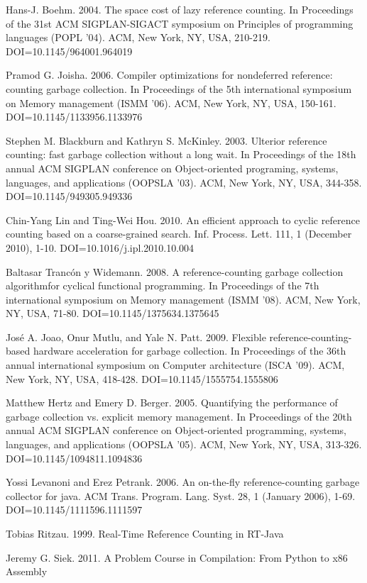 \documentclass{sigplanconf}
\begin{document}
\begin{thebibliography}{}
\softraggedright

Hans-J. Boehm. 2004. The space cost of lazy reference counting. In Proceedings of the 31st ACM SIGPLAN-SIGACT symposium on Principles of programming languages (POPL '04). ACM, New York, NY, USA, 210-219. DOI=10.1145/964001.964019 

Pramod G. Joisha. 2006. Compiler optimizations for nondeferred reference: counting garbage collection. In Proceedings of the 5th international symposium on Memory management (ISMM '06). ACM, New York, NY, USA, 150-161. DOI=10.1145/1133956.1133976

Stephen M. Blackburn and Kathryn S. McKinley. 2003. Ulterior reference counting: fast garbage collection without a long wait. In Proceedings of the 18th annual ACM SIGPLAN conference on Object-oriented programing, systems, languages, and applications (OOPSLA '03). ACM, New York, NY, USA, 344-358. DOI=10.1145/949305.949336

Chin-Yang Lin and Ting-Wei Hou. 2010. An efficient approach to cyclic reference counting based on a coarse-grained search. Inf. Process. Lett. 111, 1 (December 2010), 1-10. DOI=10.1016/j.ipl.2010.10.004 

Baltasar Trancón y Widemann. 2008. A reference-counting garbage collection algorithmfor cyclical functional programming. In Proceedings of the 7th international symposium on Memory management (ISMM '08). ACM, New York, NY, USA, 71-80. DOI=10.1145/1375634.1375645 

José A. Joao, Onur Mutlu, and Yale N. Patt. 2009. Flexible reference-counting-based hardware acceleration for garbage collection. In Proceedings of the 36th annual international symposium on Computer architecture (ISCA '09). ACM, New York, NY, USA, 418-428. DOI=10.1145/1555754.1555806

Matthew Hertz and Emery D. Berger. 2005. Quantifying the performance of garbage collection vs. explicit memory management. In Proceedings of the 20th annual ACM SIGPLAN conference on Object-oriented programming, systems, languages, and applications (OOPSLA '05). ACM, New York, NY, USA, 313-326. DOI=10.1145/1094811.1094836  

Yossi Levanoni and Erez Petrank. 2006. An on-the-fly reference-counting garbage collector for java. ACM Trans. Program. Lang. Syst. 28, 1 (January 2006), 1-69. DOI=10.1145/1111596.1111597 

Tobias Ritzau. 1999.  Real-Time Reference Counting in RT-Java

Jeremy G. Siek. 2011.  A Problem Course in Compilation: From Python to x86 Assembly

\end{thebibliography}
\end{document}
